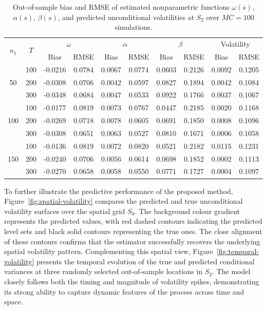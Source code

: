 \documentclass[fleqn,11pt]{article}
\begin{document}


\begin{table}[ht]
\centering
\caption{Out-of-sample bias and RMSE of estimated nonparametric functions \(\omega(s)\), \(\alpha(s)\), \(\beta(s)\), and predicted unconditional volatilities at \(S_2\) over \(MC=100\) simulations.}\label{tab:bias-rmse-full}
\begin{tabular}{cc cc cc cc cc}
\hline
\multirow{2}{*}{\(n_1\)} & \multirow{2}{*}{\(T\)} 
& \multicolumn{2}{c}{\(\omega\)} 
& \multicolumn{2}{c}{\(\alpha\)} 
& \multicolumn{2}{c}{\(\beta\)} 
& \multicolumn{2}{c}{Volatility} \\
& & Bias & RMSE & Bias & RMSE & Bias & RMSE & Bias & RMSE \\
\hline
  & 100 & -0.0216 & 0.0784 & 0.0067 & 0.0774 & 0.0603 & 0.2126 & 0.0092 & 0.1205 \\
50  & 200 & -0.0308 & 0.0706 & 0.0042 & 0.0597 & 0.0827 & 0.1894 & 0.0042 & 0.1084 \\
  & 300 & -0.0348 & 0.0684 & 0.0047 & 0.0533 & 0.0922 & 0.1766 & 0.0037 & 0.1067 \\[.2cm]
 & 100 & -0.0177 & 0.0819 & 0.0073 & 0.0767 & 0.0447 & 0.2185 & 0.0020 & 0.1168 \\
100 & 200 & -0.0269 & 0.0718 & 0.0078 & 0.0605 & 0.0691 & 0.1850 & 0.0008 & 0.1096 \\
 & 300 & -0.0308 & 0.0651 & 0.0063 & 0.0527 & 0.0810 & 0.1671 & 0.0006 & 0.1058 \\[.2cm]
 & 100 & -0.0136 & 0.0819 & 0.0072 & 0.0820 & 0.0521 & 0.2182 & 0.0115 & 0.1231 \\
150 & 200 & -0.0240 & 0.0706 & 0.0056 & 0.0614 & 0.0698 & 0.1852 & 0.0002 & 0.1113 \\
 & 300 & -0.0270 & 0.0658 & 0.0058 & 0.0550 & 0.0771 & 0.1727 & 0.0004 & 0.1097 \\
\hline
\end{tabular}
\label{tab:bias-rmse-full}
\end{table}



To further illustrate the predictive performance of the proposed method, Figure~\ref{fig:spatial-volatility} compares the predicted and true unconditional volatility surfaces over the spatial grid \(S_0\). The background colour gradient represents the predicted values, with red dashed contours indicating the predicted level sets and black solid contours representing the true ones. The close alignment of these contours confirms that the estimator successfully recovers the underlying spatial volatility pattern. Complementing this spatial view, Figure~\ref{fig:temporal-volatility} presents the temporal evolution of the true and predicted conditional variances at three randomly selected out-of-sample locations in \(S_2\). The model closely follows both the timing and magnitude of volatility spikes, demonstrating its strong ability to capture dynamic features of the process across time and space.
\end{document}
